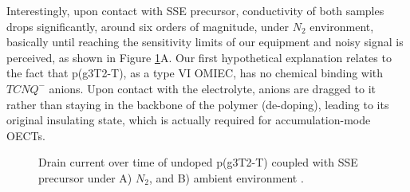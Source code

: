 Interestingly, upon contact with SSE precursor, conductivity of both samples drops significantly, around six orders of magnitude, under $N_{2}$ environment, basically until reaching the sensitivity limits of our equipment and noisy signal is perceived, as shown in Figure \ref{fig:revox1}A. Our first hypothetical explanation relates to the fact that p(g3T2-T), as a type VI OMIEC, has no chemical binding with $TCNQ^{-}$ anions. Upon contact with the electrolyte, anions are dragged to it rather than staying in the backbone of the polymer (de-doping), leading to its original insulating state, which is actually required for accumulation-mode OECTs.

\begin{figure}[ht]
    \centering
    \caption[Drain current over time of undoped-p(g3T2-T) coupled with SSE precursor]{Drain current over time of undoped p(g3T2-T) coupled with SSE precursor under A) $N_{2}$, and B) ambient environment%
    .}
    \label{fig:revox1}
\end{figure}

